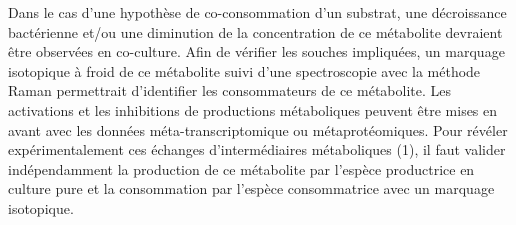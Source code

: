 \documentclass[../main.tex]{subfiles}
\begin{document}
Dans le cas d'une hypothèse de co-consommation d'un substrat, une décroissance bactérienne et/ou une diminution de la concentration de ce métabolite devraient être observées en co-culture. Afin de vérifier les souches impliquées, un marquage isotopique à froid de ce métabolite suivi d'une spectroscopie avec la méthode Raman \citep{Wang2020,CUI2022100187} permettrait d'identifier les consommateurs de ce métabolite. 
 Les activations et les inhibitions de productions métaboliques peuvent être mises en avant avec les données méta-transcriptomique ou métaprotéomiques. Pour révéler expérimentalement ces échanges d'intermédiaires métaboliques (1), il faut valider indépendamment la production de ce métabolite par l'espèce productrice en culture pure et la consommation par l'espèce consommatrice avec un marquage isotopique.
\end{document}
